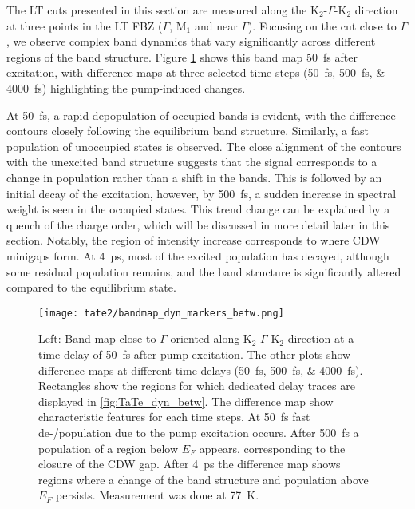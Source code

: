 The LT cuts presented in this section are measured along the K$_2$-$\Gamma$-K$_2$ direction at three points in the LT FBZ ($\Gamma$, M$_1$ and near $\Gamma$).
Focusing on the cut close to $\Gamma$, we observe complex band dynamics that vary significantly across different regions of the band structure.
Figure \ref{fig:TaTe_bandmap_dyn_betw} shows this band map \qty{50}{\femto\second} after excitation, with difference maps at three selected time steps (\qtylist{50; 500; 4000}{\femto\second}) highlighting the pump-induced changes.

At \qty{50}{\femto\second}, a rapid depopulation of occupied bands is evident, with the difference contours closely following the equilibrium band structure.
Similarly, a fast population of unoccupied states is observed.
The close alignment of the contours with the unexcited band structure suggests that the signal corresponds to a change in population rather than a shift in the bands.
This is followed by an initial decay of the excitation, however, by \qty{500}{\femto\second}, a sudden increase in spectral weight is seen in the occupied states.
This trend change can be explained by a quench of the charge order, which will be discussed in more detail later in this section.
Notably, the region of intensity increase corresponds to where CDW minigaps form.
At \qty{4}{\pico\second}, most of the excited population has decayed, although some residual population remains, and the band structure is significantly altered compared to the equilibrium state.

\begin{figure}[t!]
	\centering
	\texttt{[image: tate2/bandmap\_dyn\_markers\_betw.png]}
	\caption{Left: Band map close to $\Gamma$ oriented along K$_2$-$\Gamma$-K$_2$ direction at a time delay of \qty{50}{\femto\second} after pump excitation. The other plots show difference maps at different time delays (\qtylist{50;500;4000}{\femto\second}). Rectangles show the regions for which dedicated delay traces are displayed in \ref{fig:TaTe_dyn_betw}. The difference map show characteristic features for each time steps. At \qty{50}{\femto\second} fast de-/population due to the pump excitation occurs. After \qty{500}{\femto\second} a population of a region below $E_F$ appears, corresponding to the closure of the CDW gap. After \qty{4}{\pico\second} the difference map shows regions where a change of the band structure and population above $E_F$ persists. Measurement was done at \qty{77}{\kelvin}.}
	\label{fig:TaTe_bandmap_dyn_betw}
\end{figure}

